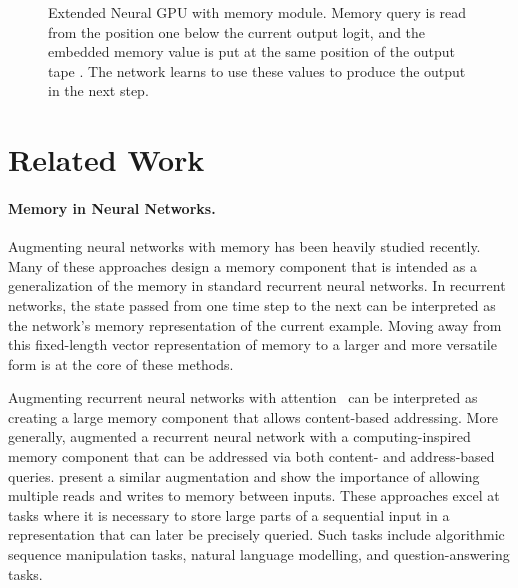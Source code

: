 \documentclass{article} \usepackage{iclr2017_conference,times}
\begin{document}
\begin{figure}
\begin{center}
\end{center}
\caption{Extended Neural GPU with memory module.
  Memory query is read from the position one below the current
  output logit, and the embedded memory value is put at the same
  position of the output tape . The network learns to use these
  values to produce the output in the next step.}
\label{fig:engpu}
\end{figure}


\section{Related Work}

\paragraph{Memory in Neural Networks.}
Augmenting neural networks with memory has been heavily studied recently.
Many of these approaches design a memory component that is intended as a generalization
of the memory in standard recurrent neural networks.  In recurrent networks, 
the state passed from one time step to the next can be interpreted as the 
network's memory representation of the current example.  Moving away from this
fixed-length vector representation of memory to a larger and more versatile form 
is at the core of these methods.

Augmenting recurrent neural networks with attention~\citep{bahdanau2014neural} can
be interpreted as creating a large memory component that allows content-based 
addressing.  More generally, \citet{ntm14} augmented a 
recurrent neural network with 
a computing-inspired memory component that can be addressed via both
content- and address-based queries.  \citet{endend_mem_net} present
a similar augmentation and show the importance of allowing
multiple reads and writes to memory between inputs.  These approaches
excel at tasks where it is necessary to store large parts of a
sequential input in a representation that can later be precisely queried.
Such tasks include algorithmic sequence manipulation tasks, natural language
modelling, and question-answering tasks.
\end{document}
